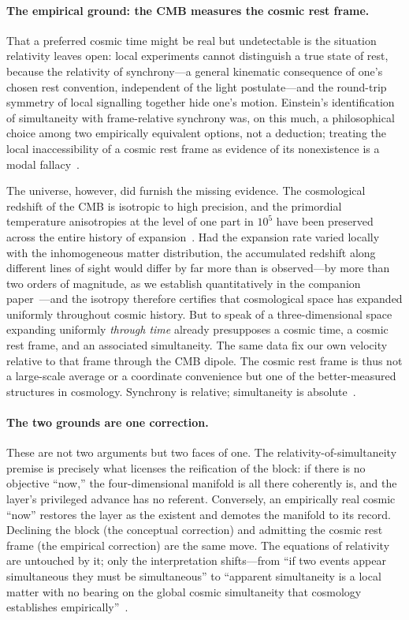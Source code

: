 \documentclass[11pt,a4paper]{article}
\theoremstyle{plain}
\theoremstyle{definition}
\theoremstyle{remark}
\begin{document}
\paragraph{The empirical ground: the CMB measures the cosmic rest frame.}
That a preferred cosmic time might be real but undetectable is the situation relativity leaves open: local experiments cannot distinguish a true state of rest, because the relativity of synchrony---a general kinematic consequence of one's chosen rest convention, independent of the light postulate---and the round-trip symmetry of local signalling together hide one's motion. Einstein's identification of simultaneity with frame-relative synchrony was, on this much, a philosophical choice among two empirically equivalent options, not a deduction; treating the local inaccessibility of a cosmic rest frame as evidence of its nonexistence is a modal fallacy~\cite{JanzenWildGoose}.

The universe, however, did furnish the missing evidence. The cosmological redshift of the CMB is isotropic to high precision, and the primordial temperature anisotropies at the level of one part in $10^5$ have been preserved across the entire history of expansion~\cite{Aghanim2020}. Had the expansion rate varied locally with the inhomogeneous matter distribution, the accumulated redshift along different lines of sight would differ by far more than is observed---by more than two orders of magnitude, as we establish quantitatively in the companion paper~\cite{JanzenModernParallax}---and the isotropy therefore certifies that cosmological space has expanded uniformly throughout cosmic history. But to speak of a three-dimensional space expanding uniformly \emph{through time} already presupposes a cosmic time, a cosmic rest frame, and an associated simultaneity. The same data fix our own velocity relative to that frame through the CMB dipole. The cosmic rest frame is thus not a large-scale average or a coordinate convenience but one of the better-measured structures in cosmology. Synchrony is relative; simultaneity is absolute~\cite{JanzenWildGoose, JanzenFortress}.

\paragraph{The two grounds are one correction.}
These are not two arguments but two faces of one. The relativity-of-simultaneity premise is precisely what licenses the reification of the block: if there is no objective ``now,'' the four-dimensional manifold is all there coherently is, and the layer's privileged advance has no referent. Conversely, an empirically real cosmic ``now'' restores the layer as the existent and demotes the manifold to its record. Declining the block (the conceptual correction) and admitting the cosmic rest frame (the empirical correction) are the same move. The equations of relativity are untouched by it; only the interpretation shifts---from ``if two events appear simultaneous they must be simultaneous'' to ``apparent simultaneity is a local matter with no bearing on the global cosmic simultaneity that cosmology establishes empirically''~\cite{JanzenFortress}.
\end{document}
